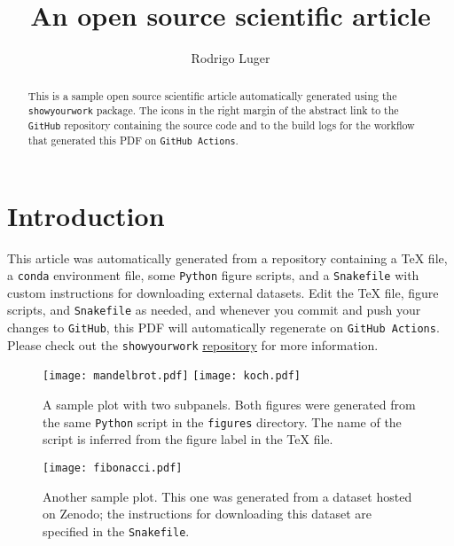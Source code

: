 \documentclass[twocolumn]{aastex631}
\begin{document}
\title{An open source scientific article}

\author{Rodrigo Luger}

\begin{abstract}
    This is a sample open source scientific article automatically generated using the \texttt{showyourwork} package.
    The icons in the right margin of the abstract link to the \texttt{GitHub} repository containing the source code and to the build logs for the workflow that generated this PDF on \texttt{GitHub Actions}.
\end{abstract}

\section{Introduction}
This article was automatically generated from a repository containing a TeX file,
a \texttt{conda} environment file, some \texttt{Python} figure scripts, and a \texttt{Snakefile} with custom instructions for downloading external datasets.
Edit the TeX file, figure scripts, and \texttt{Snakefile} as needed, and whenever you commit and push your changes to \texttt{GitHub}, this PDF will automatically regenerate on \texttt{GitHub Actions}. Please check out the \texttt{showyourwork} \href{https://github.com/rodluger/showyourwork}{repository} for more information.

\begin{figure}[ht!]
    \begin{centering}
        \texttt{[image: mandelbrot.pdf]}
        \texttt{[image: koch.pdf]}
        \caption{
            A sample plot with two subpanels.
            Both figures were generated from the same \texttt{Python} script in the \texttt{figures} directory.
            The name of the script is inferred from the figure label in the TeX file.
        }
        \label{fig:fractals}
    \end{centering}
\end{figure}

\begin{figure}[ht!]
    \begin{centering}
        \texttt{[image: fibonacci.pdf]}
        \caption{
            Another sample plot.
            This one was generated from a dataset hosted on Zenodo; the instructions for downloading this dataset are specified in the \texttt{Snakefile}.
        }
        \label{fig:fibonacci}
    \end{centering}
\end{figure}
\end{document}

